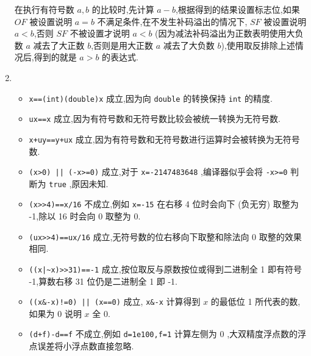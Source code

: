 \begin{enumerate}
            在执行有符号数 $a,b$ 的比较时,先计算 $a-b$,根据得到的结果设置标志位,如果 $OF$ 被设置说明 $a=b$ 不满足条件,在不发生补码溢出的情况下, $SF$ 被设置说明 $a<b$,否则 $SF$ 不被设置才说明 $a<b$ (因为减法补码溢出为正数表明使用大负数 $a$ 减去了大正数 $b$,否则是用大正数 $a$ 减去了大负数 $b$),使用取反排除上述情况后,得到的就是 $a>b$ 的表达式.
        \item 
            \begin{itemize}
                \item  \texttt{x==(int)(double)x} 成立,因为向 \texttt{double} 的转换保持 \texttt{int} 的精度.
                \item  \texttt{ux==x} 成立,因为有符号数和无符号数比较会被统一转换为无符号数.
                \item  \texttt{x+uy==y+ux} 成立,因为有符号数和无符号数进行运算时会被转换为无符号数.
                \item  \texttt{(x>0) || (-x>=0)} 成立,对于 \texttt{x=-2147483648} ,编译器似乎会将 \texttt{-x>=0} 判断为 \texttt{true} ,原因未知.
                \item  \texttt{(x>>4)==x/16} 不成立,例如  \texttt{x=-15} 在右移 4 位时会向下 (负无穷) 取整为 -1,除以 16 时会向 0 取整为 0.
                \item  \texttt{(ux>>4)==ux/16} 成立,无符号数的位右移向下取整和除法向 0 取整的效果相同.
                \item  \texttt{((x|\~{}x)>>31)==-1} 成立,按位取反与原数按位或得到二进制全 1 即有符号 -1,算数右移 31 位仍是二进制全 1 即 -1.
                \item  \texttt{((x\&-x)!=0) || (x==0)} 成立, \texttt{x\&-x} 计算得到 $x$ 的最低位 1 所代表的数,如果为 0 说明 $x$ 全 0.
                \item  \texttt{(d+f)-d==f} 不成立,例如 \texttt{d=1e100,f=1} 计算左侧为 0 ,大双精度浮点数的浮点误差将小浮点数直接忽略.
            \end{itemize}
    \end{enumerate}


